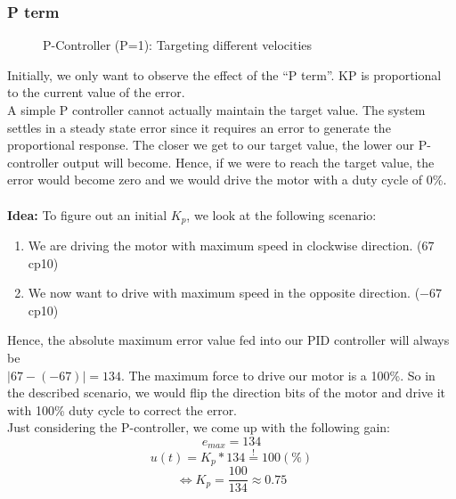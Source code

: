 \subsubsection*{P term}
\begin{figure}
    \centering
{}
    \caption{P-Controller (P=1): Targeting different velocities} \label{fig:P1}
\end{figure}
Initially, we only want to observe the effect of the ``P term''.
KP is proportional to the current value of the error.
\\A simple P controller cannot actually maintain the target value. The system settles in a steady state error since it requires an error to generate the proportional response.
The closer we get to our target value, the lower our P-controller output will become. Hence, if we were to reach the target value, the error would become zero and we would drive the motor with a duty cycle of 0\%.
\\\\
\textbf{Idea:} To figure out an initial $K_p$, we look at the following scenario:
\begin{enumerate}
    \item We are driving the motor with maximum speed in clockwise direction. ($67$ cp10)
    \item We now want to drive with maximum speed in the opposite direction. ($-67$ cp10)
\end{enumerate}
Hence, the absolute maximum error value fed into our PID controller will always be
\\$| 67 - (-67)| = 134$. The maximum force to drive our motor is a 100\%.
So in the described scenario, we would flip the direction bits of the motor and drive it with 100\% duty cycle to correct the error.\\
Just considering the P-controller, we come up with the following gain:
$$e_{max} = 134$$
$$u(t) = K_p * 134 \stackrel{!}{=} 100 (\%)$$
$$\iff K_p = \frac{100}{134} \approx 0.75$$\\

